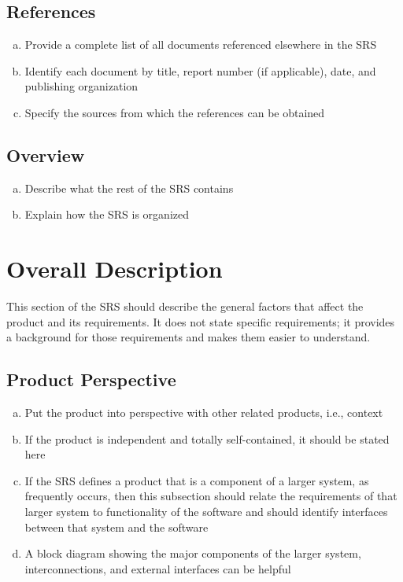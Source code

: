 \documentclass[]{article}
\begin{document}
\subsection{References}
\label{sub:references}
\begin{enumerate}[a)]
	\item Provide a complete list of all documents referenced elsewhere in the SRS
	\item Identify each document by title, report number (if applicable), date, and publishing organization
	\item Specify the sources from which the references can be obtained
\end{enumerate}

\subsection{Overview}
\label{sub:overview}
\begin{enumerate}[a)]
	\item Describe what the rest of the SRS contains
	\item Explain how the SRS is organized
\end{enumerate}


\section{Overall Description}
\label{sec:overall_description}

This section of the SRS should describe the general factors that affect the product and its requirements. It does not state specific requirements; it provides a background for those requirements and makes them easier to understand.

\subsection{Product Perspective}
\label{sub:product_perspective}
\begin{enumerate}[a)]
	\item Put the product into perspective with other related products, i.e., context
	\item If the product is independent and totally self-contained, it should be stated here
	\item If the SRS defines a product that is a component of a larger system, as frequently occurs, then this subsection should relate the requirements of that larger system to functionality of the software and should identify interfaces between that system and the software
	\item A block diagram showing the major components of the larger system, interconnections, and external interfaces can be helpful
\end{enumerate}
\end{document}
